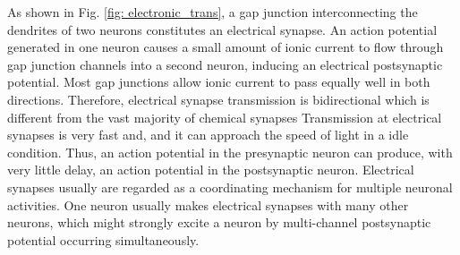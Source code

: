 \documentclass[journal,comsoc]{IEEEtran}
\begin{document}
				As shown in Fig. \ref{fig: electronic_trans}, a gap junction interconnecting the dendrites of two neurons constitutes an electrical synapse.
				An action potential generated in one neuron causes a small amount of ionic current to flow through gap junction channels into a second neuron, 
				inducing an electrical postsynaptic potential.	
				Most gap junctions allow ionic current to pass equally well in both directions.
				Therefore, electrical synapse transmission is bidirectional which is different from the vast majority of chemical synapses
				Transmission at electrical synapses is very fast and, and it can approach the speed of light in a idle condition. 
				Thus, an action potential in the presynaptic neuron can produce, with very little delay, an action potential in the postsynaptic neuron. 
				Electrical synapses usually are regarded as a coordinating mechanism for multiple neuronal activities.
				One neuron usually  makes electrical synapses with many other neurons, which might strongly excite a neuron by multi-channel postsynaptic potential occurring simultaneously. 
				
			
\end{document}
